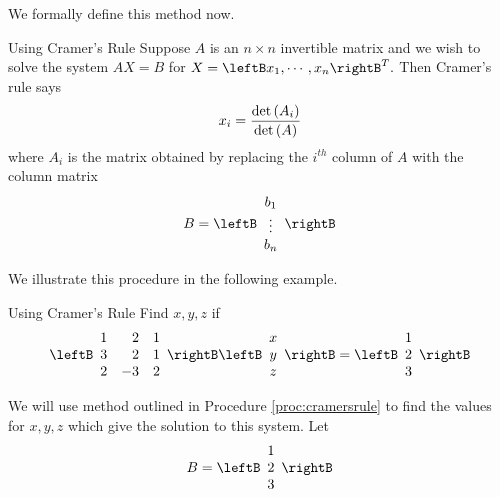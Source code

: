 {We formally define this method now. 

\begin{procedure}{Using Cramer's Rule}\label{proc:cramersrule}
Suppose $A$ is an $n\times n$ invertible matrix and we wish to solve the system 
$AX=B$ for $X
=\leftB x_{1},\cdots ,x_{n}\rightB ^{T}.$ Then Cramer's rule says
\begin{equation*}
x_{i}=
\vspace{0.05in}\frac{\det \left(A_{i}\right)}{\det \left(A\right)}
\end{equation*}
where $A_{i}$ is the matrix obtained by replacing the $i^{th}$ column of $A$
with the column matrix
\begin{equation*}
B = 
\leftB
\begin{array}{c}
b_1 \\
\vdots \\
b_n
\end{array}
\rightB
\end{equation*} 
\end{procedure}

We illustrate this procedure in the following example.

\begin{example}{Using Cramer's Rule}\label{exa:cramersrule}
Find $x,y,z$ if
\begin{equation*}
\leftB
\begin{array}{rrr}
1 & 2 & 1 \\
3 & 2 & 1 \\
2 & -3 & 2
\end{array}
\rightB \leftB
\begin{array}{c}
x \\
y \\
z
\end{array}
\rightB =\leftB
\begin{array}{r}
1 \\
2 \\
3
\end{array}
\rightB 
\end{equation*}
\end{example}

\begin{solution} We will use method outlined in Procedure \ref{proc:cramersrule} to find the values for
$x,y,z$ which give the solution to this system. 
Let
\begin{equation*}
B = 
\leftB 
\begin{array}{r}
1 \\
2 \\
3
\end{array}
\rightB 
\end{equation*}


\end{solution}}

